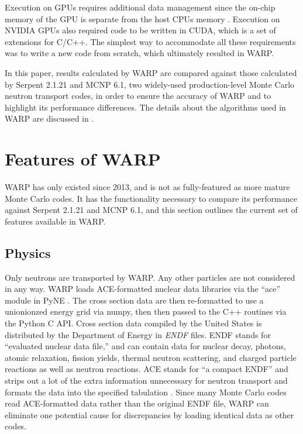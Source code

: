 \documentclass[preprint,12pt]{elsarticle}
\begin{document}
Execution on GPUs requires additional data management since the on-chip memory of the GPU is separate from the host CPUs memory \cite{cuda}.  Execution on NVIDIA GPUs also required code to be written in CUDA, which is a set of extensions for C/C++.  The simplest way to accommodate all these requirements was to write a new code from scratch, which ultimately resulted in WARP.  

In this paper, results calculated by WARP are compared against those calculated by Serpent 2.1.21 and MCNP 6.1, two widely-used production-level Monte Carlo neutron transport codes, in order to ensure the accuracy of WARP and to highlight its performance differences.  The details about the algorithms used in WARP are discussed in \cite{algorithms}.


\section{Features of WARP}
\label{sec:features}

WARP has only existed since 2013, and is not as fully-featured as more mature Monte Carlo codes.  It has the functionality necessary to compare its performance against  Serpent 2.1.21 and MCNP 6.1, and this section outlines the current set of features available in WARP.  

\subsection{Physics}

Only neutrons are transported by WARP.  Any other particles are not considered in any way.  WARP loads ACE-formatted nuclear data libraries via the ``ace'' module in PyNE \cite{pyne}.  The cross section data are then re-formatted to use a unionionzed energy grid via numpy, then then passed to the C++ routines via the Python C API.  Cross section data compiled by the United States is distributed by the Department of Energy in \emph{ENDF} files.  ENDF stands for ``evaluated nuclear data file,'' and can contain data for nuclear decay, photons, atomic relaxation, fission yields, thermal neutron scattering, and charged particle reactions as well as neutron reactions.  ACE stands for ``a compact ENDF'' and strips out a lot of the extra information unnecessary for neutron transport and formats the data into the specified tabulation \cite{endfnums}.  Since many Monte Carlo codes read ACE-formatted data rather than the original ENDF file, WARP can eliminate one potential cause for discrepancies by loading identical data as other codes.  
\end{document}
